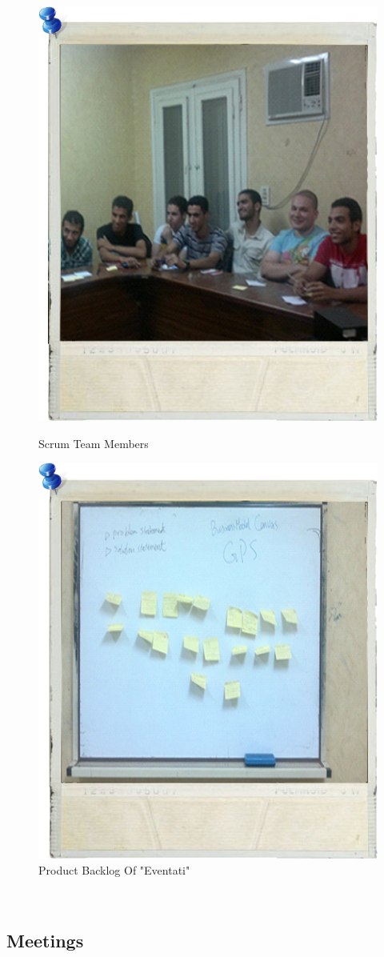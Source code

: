 \documentclass[12pt,a4paper,class,twoside,openany]{report}
\begin{document}
 \begin{figure}
	\begin{minipage}[b]{0.5\linewidth}
	\centering
	\includegraphics[height=3.5 in]{2-3}
	\caption{Scrum Team Members}
	\label{fg:2-3}
	\end{minipage}
	\hspace{0.5cm}
	\begin{minipage}[b]{0.5\linewidth}
	\centering
	\includegraphics[height=3.5 in]{2-4}
	\caption{Product Backlog  Of "Eventati" }
	\label{fg:2-4}
	\end{minipage}
	\end{figure}
 \\
\subsection{Meetings}
\end{document}
